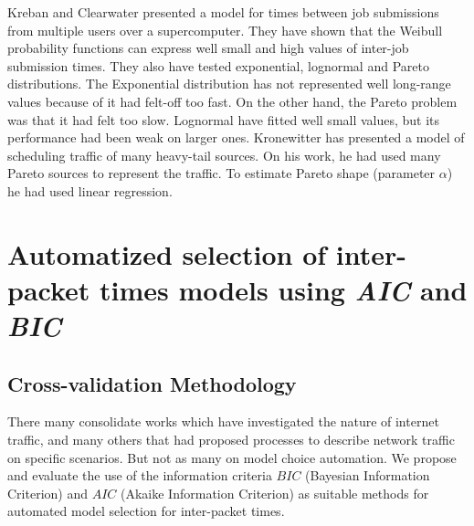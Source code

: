 Kreban and Clearwater\cite{hierarchical-dynamics-interarrival-times}  presented a model for times between job submissions from multiple users over a supercomputer. They have shown that the Weibull probability functions can express well small and high values of inter-job submission times. They also have tested exponential, lognormal and Pareto distributions. The Exponential distribution has not represented well long-range values because of it had felt-off too fast. On the other hand, the Pareto problem was that it had felt too slow. Lognormal have fitted well small values, but its performance had been weak on larger ones. Kronewitter\cite{optimal-scheduling-of-heavy-tailed-traffic} has presented a model of scheduling traffic of many heavy-tail sources. On his work, he had used many Pareto sources to represent the traffic. To estimate Pareto shape (parameter $\alpha$) he had used linear regression.


\section{Automatized selection of inter-packet times models using \textit{AIC} and \textit{BIC}}

\subsection{Cross-validation Methodology}

There many consolidate works which have investigated the nature of internet traffic, and many others that had proposed processes to describe network traffic on specific scenarios. But not as many on model choice automation.  We propose and evaluate the use of the information criteria $BIC$ (Bayesian Information Criterion) and $AIC$ (Akaike Information Criterion) as suitable methods for automated model selection for inter-packet times.  

